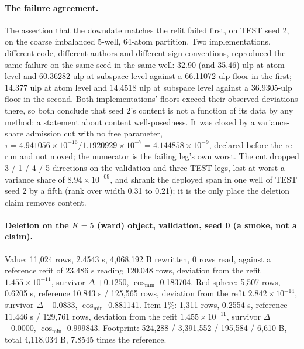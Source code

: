 \documentclass{article} %
\newcommand{\sci}[2]{\ensuremath{#1\times10^{#2}}}
\begin{document}
\paragraph{The failure agreement.} The assertion that the downdate matches the refit failed first, on TEST seed 2, on the
coarse imbalanced 5-well, 64-atom partition. Two implementations, different code, different
authors and different sign conventions, reproduced the same failure on the same seed in the same
well: 32.90 (and 35.46) ulp at atom level and 60.36282 ulp at subspace level against a 66.11072-ulp
floor in the first; 14.377 ulp at atom level and 14.4518 ulp at subspace level against a
36.9305-ulp floor in the second. Both implementations' floors exceed their observed deviations
there, so both conclude that seed 2's content is not a function of its data by any method: a
statement about content well-posedness. It was closed by a variance-share admission cut with no
free parameter, $\tau=4.941056\times10^{-16}/1.1920929\times10^{-7}=4.144858\times10^{-9}$, declared
before the re-run and not moved; the numerator is the failing leg's own worst.
The cut dropped 3 / 1 / 4 / 5 directions on the validation and three TEST legs, lost at worst a
variance share of \sci{8.94}{-09}, and shrank the deployed span in one well of TEST seed 2 by a fifth
(rank over width 0.31 to 0.21); it is the only place the deletion claim removes content.

\paragraph{Deletion on the $K=5$ (ward) object, validation, seed 0 (a smoke, not a claim).} Value:
11,024 rows, 2.4543 s, 4,068,192 B rewritten, 0 rows read, against a reference refit of 23.486 s
reading 120,048 rows, deviation from the refit \sci{1.455}{-11}, survivor $\Delta$ $+0.1250$, $\cos_{\min}$
0.183704. Red sphere: 5,507 rows, 0.6205 s, reference 10.843 s / 125,565 rows, deviation from the refit \sci{2.842}{-14}, survivor $\Delta$ $-0.0833$, $\cos_{\min}$ 0.881141. Item 1\%: 1,311 rows,
0.2554 s, reference 11.446 s / 129,761 rows, deviation from the refit \sci{1.455}{-11}, survivor $\Delta$
$+0.0000$, $\cos_{\min}$ 0.999843. Footprint: 524,288 / 3,391,552 / 195,584 / 6,610 B, total
4,118,034 B, 7.8545 times the reference. %

\end{document}
